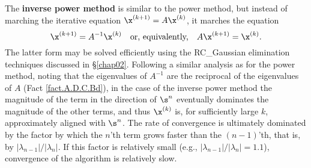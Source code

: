 The {\bf inverse power method} is similar to the power method, but instead of marching the iterative equation $\x^{(k+1)}=A\x^{(k)}$, it marches the equation
\begin{equation}
\x^{(k+1)}=A^{-1}\x^{(k)} \quad \textrm{or, equivalently,} \quad A\x^{(k+1)}=\x^{(k)}.\label{eq.inversepowermethod}
\end{equation}
The latter form may be solved efficiently using the RC_Gaussian elimination techniques discussed in \S \ref{chap02}.
Following a similar analysis as for the power method,
noting that the eigenvalues of $A^{-1}$ are the reciprocal of the eigenvalues of $A$ (Fact \ref{fact.A.D.C.Bd}),
in the case of the inverse power method the magnitude of the term in the direction of $\s^n$
eventually dominates the magnitude of the other terms, and thus $\x^{(k)}$ is, for sufficiently large $k$, approximately aligned with $\s^n$.
The rate of convergence is ultimately dominated by the factor by which the 
$n$'th term grows faster than the $(n-1)$'th, that is, by $|\lambda_{n-1}|/|\lambda_{n}|$.
If this factor is relatively small (e.g., $|\lambda_{n-1}|/|\lambda_{n}|=1.1$), convergence of the algorithm is relatively slow.
\vskip0.1in

